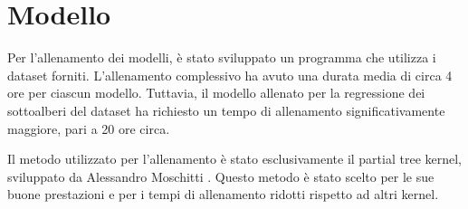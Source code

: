 \section{Modello}

Per l'allenamento dei modelli, è stato sviluppato un programma che utilizza i 
dataset forniti. L'allenamento complessivo ha avuto una durata media di circa 
4 ore per ciascun modello. Tuttavia, il modello allenato per la regressione 
dei sottoalberi del dataset ha richiesto un tempo di allenamento 
significativamente maggiore, pari a 20 ore circa.

Il metodo utilizzato per l'allenamento è stato esclusivamente il partial tree 
kernel, sviluppato da Alessandro Moschitti \cite{kernel}. Questo metodo è 
stato scelto per le sue buone prestazioni e per i tempi di allenamento ridotti 
rispetto ad altri 
kernel.
